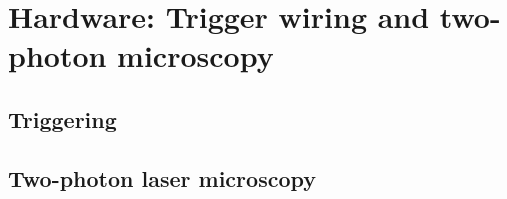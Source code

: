 \section{Hardware: Trigger wiring and two-photon microscopy}
\label{sec:sectione}

\subsection{Triggering}
\label{subsec:subasectionD}

\subsection{Two-photon laser microscopy}
\label{subsec:subbsectionD}